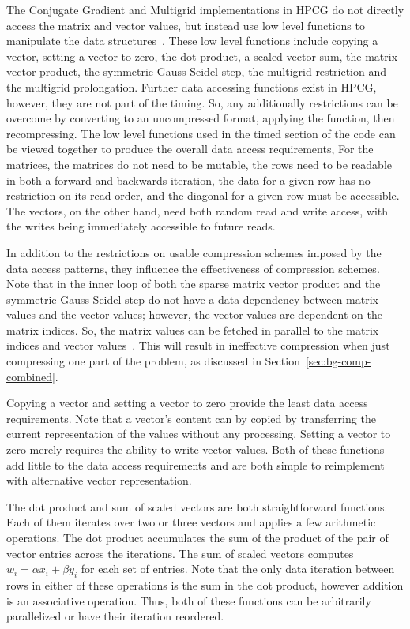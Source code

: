 The Conjugate Gradient and Multigrid implementations in HPCG do not directly access the matrix and vector values, but instead use low level functions to manipulate the data structures~\cite{Dongarra:2015:HPCG}.
These low level functions include copying a vector, setting a vector to zero, the dot product, a scaled vector sum, the matrix vector product, the symmetric Gauss-Seidel step, the multigrid restriction and the multigrid prolongation.
Further data accessing functions exist in HPCG, however, they are not part of the timing.
So, any additionally restrictions can be overcome by converting to an uncompressed format, applying the function, then recompressing.
The low level functions used in the timed section of the code can be viewed together to produce the overall data access requirements,
For the matrices, the matrices do not need to be mutable, the rows need to be readable in both a forward and backwards iteration, the data for a given row has no restriction on its read order, and the diagonal for a given row must be accessible.
The vectors, on the other hand, need both random read and write access, with the writes being immediately accessible to future reads.

In addition to the restrictions on usable compression schemes imposed by the data access patterns, they influence the effectiveness of compression schemes.
Note that in the inner loop of both the sparse matrix vector product and the symmetric Gauss-Seidel step do not have a data dependency between matrix values and the vector values; however, the vector values are dependent on the matrix indices.
So, the matrix values can be fetched in parallel to the matrix indices and vector values~\cite{Hennessy:1990:ComputerArchitecture}.
This will result in ineffective compression when just compressing one part of the problem, as discussed in Section~\ref{sec:bg-comp-combined}.

Copying a vector and setting a vector to zero provide the least data access requirements.
Note that a vector's content can by copied by transferring the current representation of the values without any processing.
Setting a vector to zero merely requires the ability to write vector values.
Both of these functions add little to the data access requirements and are both simple to reimplement with alternative vector representation.

The dot product and sum of scaled vectors are both straightforward functions.
Each of them iterates over two or three vectors and applies a few arithmetic operations.
The dot product accumulates the sum of the product of the pair of vector entries across the iterations.
The sum of scaled vectors computes \(w_i = \alpha x_i + \beta y_i\) for each set of entries.
Note that the only data iteration between rows in either of these operations is the sum in the dot product, however addition is an associative operation.
Thus, both of these functions can be arbitrarily parallelized or have their iteration reordered.

